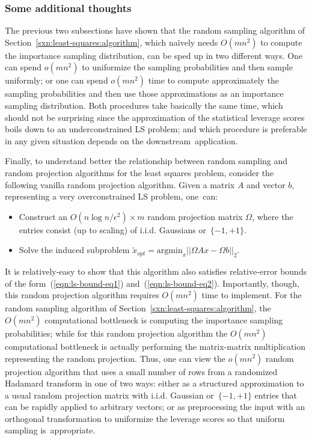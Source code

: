 \documentclass[twoside]{article}
\begin{document}
\subsubsection{Some additional thoughts}
\label{sxn:least-squares:faster-th:addl}

The previous two subsections have shown that the random sampling algorithm of 
Section~\ref{sxn:least-squares:algorithm}, which na\"{i}vely needs $O(mn^2)$ 
to compute the importance sampling distribution, can be sped up in two 
different ways.
One can spend $o(mn^2)$ to uniformize the sampling probabilities and then 
sample uniformly; or one can spend $o(mn^2)$ time to compute approximately 
the sampling probabilities and then use those approximations as an 
importance sampling distribution. 
Both procedures take basically the same time, which should not be surprising 
since the approximation of the statistical leverage scores boils down to an 
underconstrained LS problem; and which procedure is preferable in any 
given situation depends on 
the downstream~application.

Finally, to understand better the relationship between random sampling and 
random projection algorithms for the least squares problem, consider the
following vanilla random projection algorithm.
Given a matrix $A$ and vector $b$, representing a very overconstrained LS 
problem, one~can:
\begin{itemize}
\item
Construct an $O(n \log n/\epsilon^2) \times m$ random projection matrix 
$\Omega$, where the entries consist (up to scaling) of i.i.d. Gaussians 
or~$\{-1,+1\}$.
\item
Solve the induced subproblem
$ \tilde{x}_{opt} = \mbox{argmin}_x ||\Omega Ax - \Omega b||_2  $.
\end{itemize}
It is relatively-easy to show that this algorithm also satisfies relative-error bounds of the 
form~(\ref{eqn:ls-bound-eq1}) and~(\ref{eqn:ls-bound-eq2}).
Importantly, though, this random projection algorithm 
requires $O(mn^2)$ time to implement.
For the random sampling algorithm of 
Section~\ref{sxn:least-squares:algorithm}, the $O(mn^2)$ computational 
bottleneck is computing the importance sampling probabilities; while for 
this random projection algorithm the $O(mn^2)$ computational bottleneck is 
actually performing the matrix-matrix multiplication representing the random 
projection.
Thus, one can view the $o(mn^2)$ random projection algorithm that uses a 
small number of rows from a randomized Hadamard transform in one of two 
ways: either as a structured approximation to a usual random projection 
matrix with i.i.d. Gaussian or~$\{-1,+1\}$ entries that can be rapidly 
applied to arbitrary vectors; or as preprocessing the input with an 
orthogonal transformation to uniformize the leverage scores so that uniform 
sampling is~appropriate.
\end{document}
